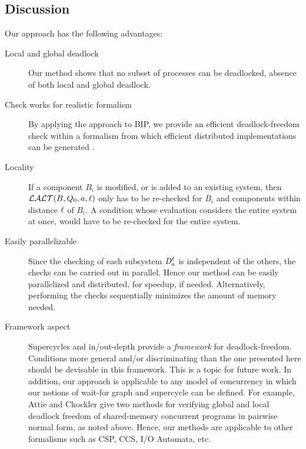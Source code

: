 \subsection{Discussion}
Our approach has the following advantages:
\begin{description}

\item[Local and global deadlock] Our method shows that no subset of processes
  can be deadlocked, \ie absence of both local and global deadlock. 

\item[Check works for realistic formalism]   By applying the approach to BIP, we
provide an efficient deadlock-freedom check within a formalism from
which efficient distributed implementations can be generated
\cite{BonakdarpourBJQS10b}.  

\item[Locality] If a component $B_i$ is modified, or is added to an
  existing system, then $\mathcal{LALT}(B, Q_0, a, \ell)$ only has to
  be re-checked for $B_i$ and components within distance $\ell$ of $B_i$.
  A condition whose evaluation considers the entire
  system at once, \eg \cite{AB03,DFinder2,GS03}
  would have to be re-checked for the entire system. 

\item[Easily parallelizable] Since the checking of each subsystem $\mathit{D}_{a}^{\ell}$
  is independent of the others, the checks can be carried out in parallel. Hence
  our method can be easily parallelized and distributed, for speedup, if needed.
  Alternatively, performing the checks sequentially
  minimizes the amount of memory needed. 

\item[Framework aspect] Supercycles and in/out-depth provide a \emph{framework} for
  deadlock-freedom. Conditions more general and/or discriminating than
  the one presented here 
  should be devisable in this framework. This is a topic for future work.
In addition, our approach is applicable to any model of concurrency in
which our notions of wait-for graph and supercycle can be defined. For example,  Attie and Chockler \cite{AC05} give two methods for verifying global
and local deadlock freedom of shared-memory concurrent programs in pairwise normal form, as noted above.
Hence, our methods are applicable to other formalisms such as CSP, CCS, I/O Automata, etc.


\end{description}


